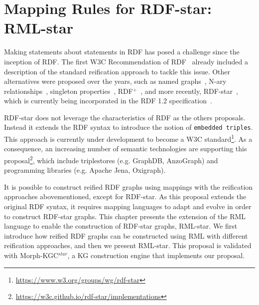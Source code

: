 \section{Mapping Rules for RDF-star: RML-star}
\label{sec:chp4_rml_star}




Making statements about statements in RDF has
posed a challenge since the inception of RDF.
The first W3C Recommendation of RDF~\citep{lassila1999rdf} already included a description of the standard reification approach to tackle this issue.
Other alternatives were proposed over the years,
such as named graphs~\citep{carroll2005namedgraphs}, N-ary relationships~\citep{naryw3c2006}, singleton properties~\citep{nguyen2014don}, RDF$^+$~\citep{schueler2008querying}, and more recently, \mbox{RDF-star}~\citep{hartig2017foundations}, which is currently being incorporated in the RDF 1.2 specification~\citep{hartig2023rdf}. 

RDF-star does not leverage the characteristics of RDF as the others proposals. Instead it extends the RDF syntax to introduce the notion of \texttt{embedded triples}. This approach is currently under development to become a W3C standard\footnote{\url{https://www.w3.org/groups/wg/rdf-star}}. 
As a consequence, an increasing number of semantic technologies are supporting this proposal\footnote{\url{https://w3c.github.io/rdf-star/implementations}}, which include triplestores (e.g. GraphDB, AnzoGraph) and programming libraries (e.g. Apache Jena, Oxigraph).

It is possible to construct reified RDF graphs using mappings with the reification approaches abovementioned, except for RDF-star. As this proposal extends the original RDF syntax, it requires mapping languages to adapt and evolve in order to construct RDF-star graphs. This chapter presents the extension of the RML language to enable the construction of RDF-star graphs, RML-star. We first introduce how reified RDF graphs can be constructed using RML with different reification approaches, and then we present RML-star. This proposal is validated with \mbox{Morph-KGC$^{star}$}, a KG construction engine that implements our proposal.

